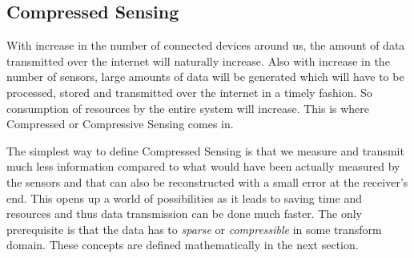 \documentclass[12pt]{article}
\theoremstyle{definition}
\def\x{$x$\hspace{0.1in}}
\begin{document}
  \subsection{Compressed Sensing}
  With increase in the number of connected devices around us, the amount of data transmitted over the internet will naturally
  increase. Also with increase in the number of sensors, large amounts of data will be generated which will have to be 
  processed, stored and transmitted over the internet in a timely fashion. So consumption of resources by the entire system
  will increase. This is where Compressed or Compressive Sensing comes in. 
  \par The simplest way to define Compressed Sensing is that we measure and transmit much less information
  compared to what would have been actually measured by the sensors 
  and that can also be reconstructed with a 
  small error at the receiver's end.
  This opens up a world of possibilities as it leads to saving time and resources and thus data transmission can be done
  much faster. The only prerequisite is that the data has to \textit{sparse} or \textit{compressible}
  in some transform domain. These concepts
  are defined mathematically in the next section.
%  
\end{document}
